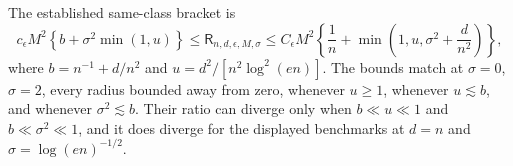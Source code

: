 The established same-class bracket is
\[
 c_{\epsilon}M^2\left\{b+\sigma^2\min(1,u)\right\}
 \le \mathsf R_{n,d,\epsilon,M,\sigma}
 \le C_{\epsilon}M^2\left\{\frac1n+\min\left(1,u,\sigma^2+\frac d{n^2}\right)\right\},
\]
where \(b=n^{-1}+d/n^2\) and \(u=d^2/[n^2\log^2(en)]\).  The bounds match at \(\sigma=0\), \(\sigma=2\), every radius bounded away from zero, whenever \(u\ge1\), whenever \(u\lesssim b\), and whenever \(\sigma^2\lesssim b\).  Their ratio can diverge only when \(b\ll u\ll1\) and \(b\ll\sigma^2\ll1\), and it does diverge for the displayed benchmarks at \(d=n\) and \(\sigma=\log(en)^{-1/2}\).